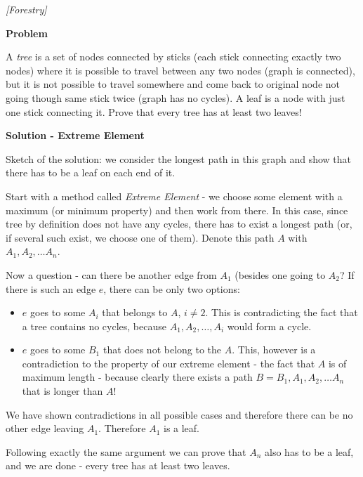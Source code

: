 %
\filbreak
\begin{problem}
\textit{[Forestry]}

\textbf{Problem}

A \textit{tree} is a set of nodes connected by sticks (each stick connecting exactly two nodes) where it is possible to travel between any two nodes (graph is connected), but it is not possible to travel somewhere and come back to original node not going though same stick twice (graph has no cycles).  A leaf is a node with just one stick connecting it. Prove that every tree has at least two leaves!

\textbf{Solution - Extreme Element}

Sketch of the solution: we consider the longest path in this graph and show that there has to be a leaf on each end of it.

Start with a method called \textit{Extreme Element} - we choose some element with a maximum (or minimum property) and then work from there. In this case, since tree by definition does not have any cycles, there has to exist a longest path (or, if several such exist, we choose one of them). Denote this path $A$ with $A_1,A_2,\dots A_n$.

Now a question - can there be another edge from $A_1$ (besides one going to $A_2$? If there is such an edge $e$, there can be only two options:
\begin{itemize}
\item $e$ goes to some $A_i$ that belongs to $A$, $i \ne 2$. This is contradicting the fact that a tree contains no cycles, because $A_1, A_2, \dots, A_i$ would form a cycle. 
\item $e$ goes to some $B_1$ that does not belong to the $A$. This, however is a contradiction to the property of our extreme element - the fact that $A$ is of maximum length - because clearly there exists a path $B = B_1,A_1,A_2,\dots A_n$ that is longer than $A$!
\end{itemize}
We have shown contradictions in all possible cases and therefore there can be no other edge leaving $A_1$. Therefore $A_1$ is a leaf. 

Following exactly the same argument we can prove that $A_n$ also has to be a leaf, and we are done - every tree has at least two leaves. 

\end{problem}
%
\filbreak
